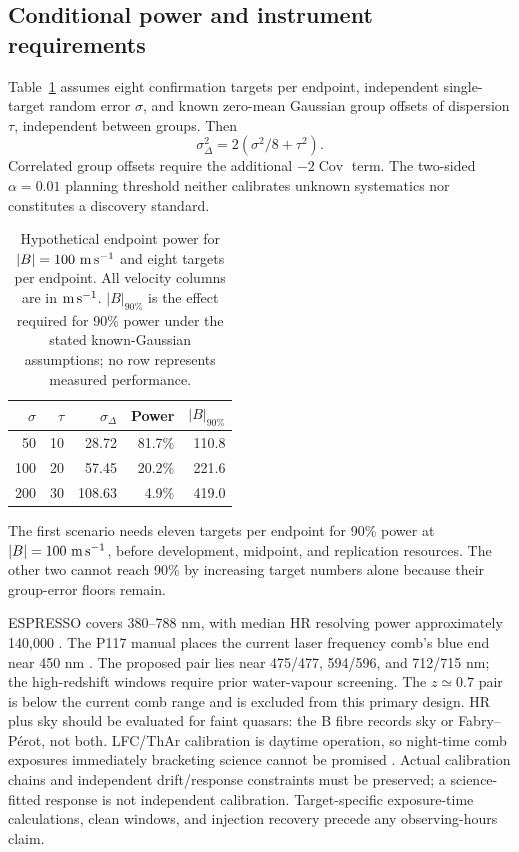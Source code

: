 \subsection{Conditional power and instrument requirements}
\label{app:prediction_power}

Table~\ref{app:power_table} assumes eight confirmation targets per endpoint,
independent single-target random error $\sigma$, and known zero-mean Gaussian
group offsets of dispersion $\tau$, independent between groups.  Then
\begin{equation}
 \sigma_\Delta^2=2(\sigma^2/8+\tau^2).
 \label{app:power_variance}
\end{equation}
Correlated group offsets require the additional $-2\operatorname{Cov}$ term.
The two-sided $\alpha=0.01$ planning threshold neither calibrates unknown
systematics nor constitutes a discovery standard.

\begin{table}[tbp]
 \centering
 \caption{Hypothetical endpoint power for $|B|=100\ {\rm m\,s^{-1}}$ and
 eight targets per endpoint.  All velocity columns are in
 ${\rm m\,s^{-1}}$.  $|B|_{90\%}$ is the effect required for 90\% power under
 the stated known-Gaussian assumptions; no row represents measured performance.}
 \label{app:power_table}
 \begin{tabular}{rrrrr}
 \toprule
 $\sigma$ & $\tau$ & $\sigma_\Delta$ & Power & $|B|_{90\%}$\\
 \midrule
 50 & 10 & 28.72 & 81.7\% & 110.8\\
 100 & 20 & 57.45 & 20.2\% & 221.6\\
 200 & 30 & 108.63 & 4.9\% & 419.0\\
 \bottomrule
 \end{tabular}
\end{table}

The first scenario needs eleven targets per endpoint for 90\% power at
$|B|=100\ {\rm m\,s^{-1}}$, before development, midpoint, and replication
resources.  The other two cannot reach 90\% by increasing target numbers
alone because their group-error floors remain.

ESPRESSO covers 380--788 nm, with median HR resolving power approximately
140,000 \citep{ESOESPRESSO2026}.  The P117 manual places the current laser
frequency comb's blue end near 450 nm \citep{ESOESPRESSOManualP117}.
The proposed pair lies near 475/477, 594/596, and 712/715 nm; the high-redshift
windows require prior water-vapour screening.  The $z\simeq0.7$ pair is below
the current comb range and is excluded from this primary design.  HR plus
sky should be evaluated for faint quasars: the B fibre records sky or
Fabry--P\'erot, not both.  LFC/ThAr calibration is daytime operation, so
night-time comb exposures immediately bracketing science cannot be promised
\citep{ESOESPRESSOManualP117}.  Actual calibration chains and independent
drift/response constraints must be preserved; a science-fitted response is
not independent calibration.  Target-specific exposure-time calculations,
clean windows, and injection recovery precede any observing-hours claim.

